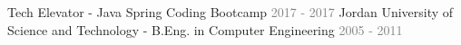 \begin{cventries}\vspace{-10mm}
\cventry 
    {}
    {}
    {}
    {}
    {}\vspace{-8mm}  
\cventry 
    {}
    {\hspace*{0.5mm}\bullet \hspace*{0.5mm} Tech Elevator - \textmd{Java Spring Coding Bootcamp}}
    {\textcolor{graytext}{2017 - 2017}}
    {}
    {}\vspace{-8mm} 
\cventry
    {}
    {\hspace*{0.5mm}\bullet \hspace*{0.5mm} Jordan University of Science and Technology - \textmd{B.Eng. in Computer Engineering}}
    {\textcolor{graytext}{2005 - 2011}}
    {}
    {}
\end{cventries}
